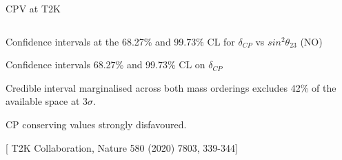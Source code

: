 \begin{frame}[t]{CPV at T2K}
\begin{columns}[T]
\begin{column}{0.60\textwidth}
\begin{itemize}
{        \item Confidence intervals at the 68.27\% and 99.73\% CL for $\delta_{CP}$ vs $sin^{2}\theta_{23}$ (NO)
        \item Confidence intervals  68.27\% and 99.73\% CL on $\delta_{CP}$
        \begin{itemize}
          {\small
          \item Credible interval marginalised across both mass orderings excludes 42\% of the
                available space at 3$\sigma$.
          \item CP conserving values strongly disfavoured.
          }
        \end{itemize}
        }
      \end{itemize}
      [{\color{blue} \scriptsize T2K Collaboration, Nature 580 (2020) 7803, 339-344}]\\
    \end{column}
  \end{columns}

\end{frame}

%
%
%

